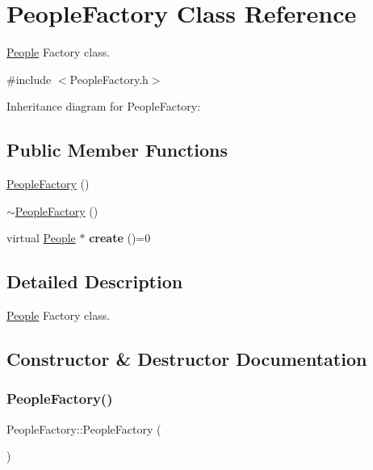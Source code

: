 \hypertarget{classPeopleFactory}{}\section{People\+Factory Class Reference}
\label{classPeopleFactory}


\hyperlink{classPeople}{People} Factory class.  




{\ttfamily \#include $<$People\+Factory.\+h$>$}



Inheritance diagram for People\+Factory\+:
\subsection*{Public Member Functions}
\begin{DoxyCompactItemize}
\item 
\hyperlink{classPeopleFactory_a937ce020364a355d6689c365ba70f0d6}{People\+Factory} ()
\item 
\hyperlink{classPeopleFactory_a18d1aec526ba93ca84cde1c25cfb8944}{$\sim$\+People\+Factory} ()
\item 
\mbox{\label{classPeopleFactory_a2a61d6ec85c72d8b1c28752609e60d10}} 
virtual \hyperlink{classPeople}{People} $\ast$ {\bfseries create} ()=0
\end{DoxyCompactItemize}


\subsection{Detailed Description}
\hyperlink{classPeople}{People} Factory class. 

\subsection{Constructor \& Destructor Documentation}
\mbox{\label{classPeopleFactory_a937ce020364a355d6689c365ba70f0d6}} 
\subsubsection{\texorpdfstring{People\+Factory()}{PeopleFactory()}}
{\footnotesize\ttfamily People\+Factory\+::\+People\+Factory (\begin{DoxyParamCaption}{ }\end{DoxyParamCaption})}


